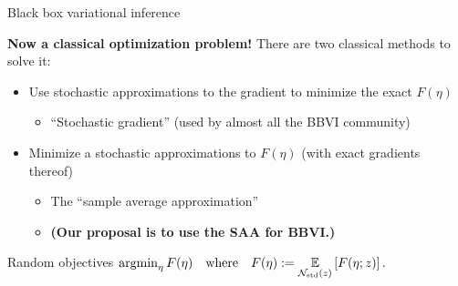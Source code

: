 \documentclass[8pt]{beamer}\usepackage[]{graphicx}\usepackage[]{color}
\begin{document}
\begin{frame}[t]{Black box variational inference \citep{blei:2016:variational,ranganath:2014:bbvi}}
%

\textbf{Now a classical optimization problem!}  \pause There are two classical
methods to solve it:
%
\begin{itemize}
    \item Use stochastic approximations to the gradient to minimize the exact
        $F(\eta)$
    \begin{itemize}
        \item ``Stochastic gradient'' (used by almost all the BBVI community)
    \end{itemize}
    \pause
    \item Minimize a stochastic approximations to $F(\eta)$ (with
        exact gradients thereof)
    \begin{itemize}
        \item The ``sample average approximation'' \citep{kim:2015:guidetosaa} 
        \item \textbf{(Our proposal is to use the SAA for BBVI.)}
    \end{itemize}
\end{itemize}
%


\end{frame}





\begin{frame}{Random objectives}
    $\operatorname*{\mathrm{argmin}}_{\eta} F(\eta) \quad\textrm{where}\quad F(\eta) := \underset{\mathcal{N}_{\mathrm{std}}\left(z\right)}{\mathbb{E}}\left[F(\eta; z)\right].$
    \vspace{2em}
  \centering
\end{frame}
\end{document}
